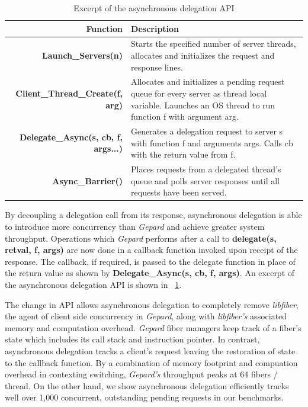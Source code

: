 \documentclass{uicthesi}
\begin{document}
\begin{table}[ht!]
\begin{tabularx}{\linewidth}{| r | X |} %
  \hline
  \bf{Function} & \bf{Description} \\
  \hline
  \bf{Launch\_Servers(n)} & Starts the specified number of server threads, allocates and initializes the request and response lines. \\
  \hline
  \bf{Client\_Thread\_Create(f, arg)} & Allocates and initializes a pending request queue for every server as thread local variable. Launches an OS thread to run function f with argument arg. \\
  \hline
  \bf{Delegate\_Async(s, cb, f, args...)} & Generates a delegation request to server s with function f and arguments args. Calls cb with the return value from f. \\
  \hline
  \bf{Async\_Barrier()} & Places requests from a delegated thread's queue and polls server responses until all requests have been served. \\
  \hline
\end{tabularx}
\label{tab:api}
\caption{Excerpt of the asynchronous delegation API}
\end{table}

By decoupling a delegation call from its response, asynchronous delegation is able to introduce more concurrency than \textit{Gepard} and achieve greater system throughput. Operations which \textit{Gepard} performs after a call to \textbf{delegate(s, retval, f, args)} are now done in a callback function invoked upon receipt of the response. The callback, if required, is passed to the delegate function in place of the return value as shown by \textbf{Delegate\_Async(s, cb, f, args)}. An excerpt of the asynchronous delegation API is shown  in ~\ref{tab:api}. 

The change in API allows asynchronous delegation to completely remove \textit{libfiber}, the agent of client side concurrency in \textit{Gepard}, along with \textit{libfiber's} associated memory and computation overhead. \textit{Gepard} fiber managers keep track of a fiber's state which includes its call stack and instruction pointer. In contrast, asynchronous delegation tracks a client's request leaving the restoration of state to the callback function. By a combination of memory footprint and compuation overhead in contexting switching, \textit{Gepard's} throughput peaks at 64 fibers / thread. On the other hand, we show asynchronous delegation efficiently tracks well over 1,000 concurrent, outstanding pending requests in our benchmarks. 
\end{document}
